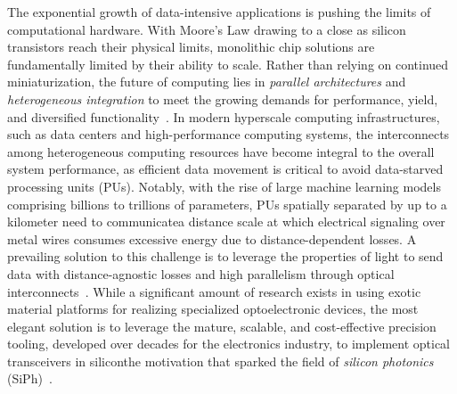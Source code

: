 The exponential growth of data-intensive applications is pushing the limits of computational hardware. With Moore's Law drawing to a close as silicon transistors reach their physical limits, monolithic chip solutions are fundamentally limited by their ability to scale. Rather than relying on continued miniaturization, the future of computing lies in \emph{parallel architectures} and \emph{heterogeneous integration} to meet the growing demands for performance, yield, and diversified functionality~\cite{iyerHeterogeneousIntegrationPerformance2016}. In modern hyperscale computing infrastructures, such as data centers and high-performance computing systems, the interconnects among heterogeneous computing resources have become integral to the overall system performance, as efficient data movement is critical to avoid data-starved processing units (PUs). Notably, with the rise of large machine learning models comprising billions to trillions of parameters, PUs spatially separated by up to a kilometer need to communicate\textemdash{}a distance scale at which electrical signaling over metal wires consumes excessive energy due to distance-dependent losses. A prevailing solution to this challenge is to leverage the properties of light to send data with distance-agnostic losses and high parallelism through optical interconnects~\cite{millerRationaleChallengesOptical2000}. While a significant amount of research exists in using exotic material platforms for realizing specialized optoelectronic devices, the most elegant solution is to leverage the mature, scalable, and cost-effective precision tooling, developed over decades for the electronics industry, to implement optical transceivers in silicon\textemdash{}the motivation that sparked the field of \emph{silicon photonics} (SiPh)~\cite{sorefPresentFutureSilicon2006}.

